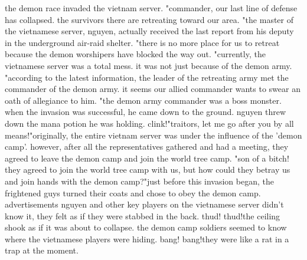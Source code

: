 the demon race invaded the vietnam server.
"commander, our last line of defense has collapsed.
 the survivors there are retreating toward our area.
"the master of the vietnamese server, nguyen, actually received the last report from his deputy in the underground air-raid shelter.
"there is no more place for us to retreat because the demon worshipers have blocked the way out.
"currently, the vietnamese server was a total mess.
 it was not just because of the demon army.
 "according to the latest information, the leader of the retreating army met the commander of the demon army.
 it seems our allied commander wants to swear an oath of allegiance to him.
"the demon army commander was a boss monster.
 when the invasion was successful, he came down to the ground.
nguyen threw down the mana potion he was holding.
clink!"traitors, let me go after you by all means!"originally, the entire vietnam server was under the influence of the 'demon camp'.
 however, after all the representatives gathered and had a meeting, they agreed to leave the demon camp and join the world tree camp.
"son of a bitch! they agreed to join the world tree camp with us, but how could they betray us and join hands with the demon camp?"just before this invasion began, the frightened guys turned their coats and chose to obey the demon camp.
advertisements    nguyen and other key players on the vietnamese server didn't know it, they felt as if they were stabbed in the back.
thud! thud!the ceiling shook as if it was about to collapse.
 the demon camp soldiers seemed to know where the vietnamese players were hiding.
bang! bang!they were like a rat in a trap at the moment.


 